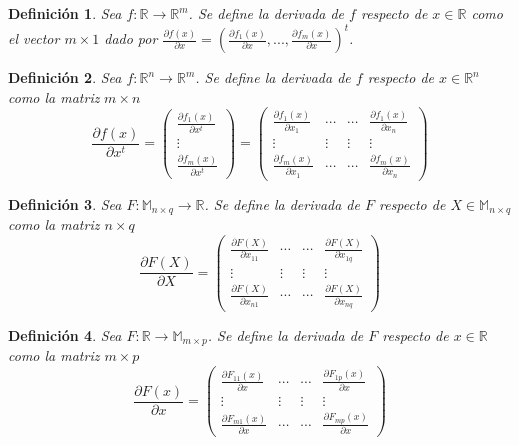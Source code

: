 \documentclass{article}
\theoremstyle{theorem-style}  %
\theoremstyle{definition}
\newtheorem{definition}{Definición}[section]
\theoremstyle{example-style}
\begin{document}
\begin{definition}
\textit{	Sea $f:\mathbb{R}\rightarrow \mathbb{R}^m$. Se define la derivada de $f$ respecto de $x\in \mathbb{R}$ como el vector $m\times 1$ dado por $\displaystyle \frac{\partial f(x)}{\partial x} = \displaystyle \left( \frac{\partial f_1(x)}{\partial x},..., \frac{\partial f_m(x)}{\partial x} \right)^t$.}
\end{definition}

\begin{definition}
\textit{	Sea $f:\mathbb{R}^n\rightarrow \mathbb{R}^m$. Se define la derivada de $f$ respecto de $x\in \mathbb{R}^n$ como la matriz} $m\times n$
	$$ \frac{\partial f(x)}{\partial x^t} = \left( \begin{array}{c}
											\frac{\partial f_1(x)}{\partial x^t} \\ \vdots \\ \frac{\partial f_m(x)}{\partial x^t}
											\end{array}\right) =
											\left( \begin{array}{cccc}
											\frac{\partial f_1(x)}{\partial x_1} & \cdots & \cdots & \frac{\partial f_1(x)}{\partial x_n}\\
											\vdots & \vdots & \vdots & \vdots \\
											\frac{\partial f_m(x)}{\partial x_1} & \cdots & \cdots & \frac{\partial f_m(x)}{\partial x_n}
											\end{array}\right)$$
\end{definition}

\begin{definition}
\textit{	Sea $F:\mathbb{M}_{n\times q}\rightarrow \mathbb{R}$. Se define la derivada de $F$ respecto de $X\in \mathbb{M}_{n\times q}$ como la matriz $n\times q$}
	$$ \frac{\partial F(X)}{\partial X} = \left( \begin{array}{cccc}
			\frac{\partial F(X)}{\partial x_{11}} & \cdots & \cdots & \frac{\partial F(X)}{\partial x_{1q}}\\
			\vdots & \vdots & \vdots & \vdots \\
			\frac{\partial F(X)}{\partial x_{n1}} & \cdots & \cdots & \frac{\partial F(X)}{\partial x_{nq}}
	\end{array}\right)$$
\end{definition}

\begin{definition}
\textit{	Sea $F:\mathbb{R}\rightarrow \mathbb{M}_{m\times p}$. Se define la derivada de $F$ respecto de $x\in \mathbb{R}$ como la matriz $m\times p$}
	$$ \frac{\partial F(x)}{\partial x} = \left( \begin{array}{cccc}
			\frac{\partial F_{11}(x)}{\partial x} & \cdots & \cdots & \frac{\partial F_{1p}(x)}{\partial x}\\
			\vdots & \vdots & \vdots & \vdots \\
			\frac{\partial F_{m1}(x)}{\partial x} & \cdots & \cdots & \frac{\partial F_{mp}(x)}{\partial x}
	\end{array}\right)$$	
\end{definition}
\end{document}
